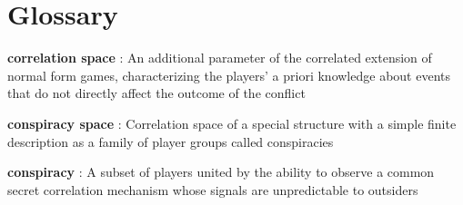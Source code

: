\chapter*{Glossary}             %

\textbf{correlation space} : An additional parameter of the correlated extension of normal form games, characterizing the players' a priori knowledge about events that do not directly affect the outcome of the conflict %

\textbf{conspiracy space} : Correlation space of a special structure with a simple finite description as a family of player groups called conspiracies %

\textbf{conspiracy} : A subset of players united by the ability to observe a common secret correlation mechanism whose signals are unpredictable to outsiders %
